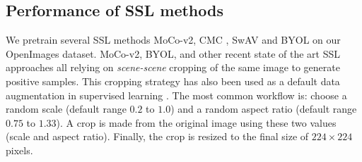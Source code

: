 \subsection{Performance of SSL methods}
\label{sec:sslanalysis}

We pretrain several SSL methods MoCo-v2, CMC \citep{tian2019contrastive}, SwAV  \citep{NEURIPS2020_70feb62b} and BYOL \citep{grill2020bootstrap} on our OpenImages dataset. 
MoCo-v2, BYOL, and other recent state of the art SSL approaches all relying on \emph{scene-scene} cropping of the same image to generate positive samples. This cropping strategy has also been used as a default data augmentation in supervised learning \citep{He2015,NIPS2012_c399862d,cubuk2019autoaugment}. The most common workflow is: choose a random scale (default range $0.2$ to $1.0$) and a random aspect ratio (default range $0.75$ to $1.33$). A crop is made from the original image using these two values (scale and aspect ratio). Finally, the crop is resized to the final size of $224 \times 224$ pixels. %

